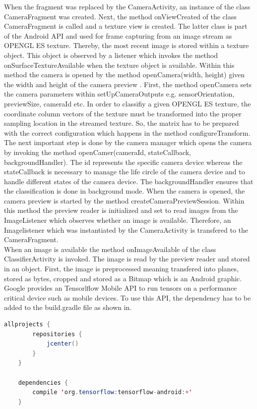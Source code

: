 When the fragment was replaced by the CameraActivity, an instance of the class CameraFragment was created. Next, the method onViewCreated of the class CameraFragment is called and a texture view is created. The latter class is part of the Android API and used for frame capturing from an image stream as OPENGL ES texture. Thereby, the most recent image is stored within a texture object. This object is observed by a listener which invokes the method onSurfaceTextureAvailable when the texture object is available. Within this method the camera is opened by the method openCamera(width, height) given the width and height of the camera preview \citep{AndroidDevelopers}. First, the method openCamera sets the camera parameters within setUpCameraOutputs e.g. sensorOrientation, previewSize, cameraId etc. In order to classifiy a given OPENGL ES texture, the coordinate column vectors of the texture must be transformed into the proper sampling location in the streamed texture. So, the matrix has to be prepared with the correct configuration which happens in the method configureTransform. The next important step is done by the camera manager which opens the camera by invoking the method openCamer(cameraId, stateCallback, backgroundHandler). The id represents the specific camera device whereas the stateCallback is necessary to manage the life circle of the camera device and to handle different states of the camera device. The backgroundHandler ensures that the classification is done in background mode. When the camera is opened, the camera preview is started by the method createCameraPreviewSession. Within this method the preview reader is initialized and set to read images from the ImageListener which observes whether an image is available. Therefore, an Imagelistener which was instantiated by the CameraActivity is transfered to the CameraFragment. \\

When an image is available the method onImageAvailable of the class ClassifierActivity is invoked. The image is read by the preview reader and stored in an object. First, the image is preprocessed meaning transfered into planes, stored as bytes, cropped and stored as a Bitmap which is an Android graphic. Google provides an Tensorlflow Mobile API to run tensors on a performance critical device such as mobile devices. To use this API, the dependency has to be added to the build.gradle file as shown in. 

\begin{minipage}{\linewidth}
\begin{lstlisting}[caption=Tensorflow API in build.gradle, label=list:tensorflow_api, language=java]
	allprojects {
  		repositories {
        	jcenter()
    	}
	}

	dependencies {
    	compile 'org.tensorflow:tensorflow-android:+'
	}
\end{lstlisting}
\end{minipage}

